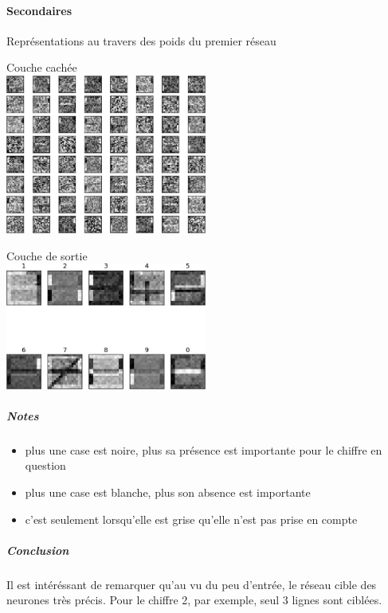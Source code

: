     \paragraph{Secondaires}
      Représentations au travers des poids du premier réseau
      \begin{center}
	Couche cachée \\
	\includegraphics[width=250px]{data/expA2/representation_hidden.png}
      \end{center}
      \begin{center}
	Couche de sortie \\
	\includegraphics[width=250px]{data/expA2/representation.png}
      \end{center} 
      \subparagraph{Notes}
	\begin{itemize}
	  \item plus une case est noire, plus sa présence est importante pour le chiffre en question
	  \item plus une case est blanche, plus son absence est importante
	  \item c'est seulement lorsqu'elle est grise qu'elle n'est pas prise en compte
	\end{itemize}
      \subparagraph{Conclusion}
      Il est intéréssant de remarquer qu'au vu du peu d'entrée, le réseau cible des neurones très précis.
      Pour le chiffre 2, par exemple, seul 3 lignes sont ciblées.
